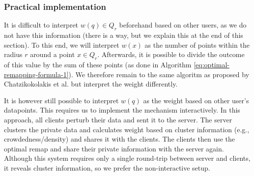 \subsubsection{Practical implementation}
It is difficult to interpret $w(q) \in Q_r$ beforehand based on other users, as we do not have this information (there is a way, but we explain this at the end of this section).
To this end, we will interpret $w(x)$ as the number of points within the radius $r$ around a point $x \in Q_r$.
Afterwards, it is possible to divide the outcome of this value by the sum of these points (as done in Algorithm \ref{eq:optimal-remapping-formula-1}).
We therefore remain to the same algoritm as proposed by Chatzikokolakis et al. but interpret the weight differently.

It is however still possible to interpret $w(q)$ as the weight based on other user's datapoints.
This requires us to implement the mechanism interactively.
In this approach, all clients perturb their data and sent it to the server.
The server clusters the private data and calculates weight based on cluster information (e.g., crowdedness/density) and shares it with the clients.
The clients then use the optimal remap and share their private information with the server again.
Although this system requires only a single round-trip between server and clients, it reveals cluster information, so we prefer the non-interactive setup.

